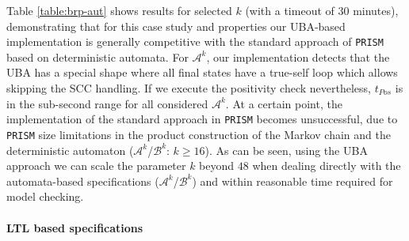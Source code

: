 \documentclass{elsarticle}
\def\cA{\mathcal{A}}
\def\cB{\mathcal{B}}
\newcommand{\prism}{\texttt{PRISM}}
\begin{document}
Table \ref{table:brp-aut} shows results for selected $k$ (with a timeout of $30$ minutes),
demonstrating that for this case study and properties
our UBA-based implementation is generally competitive with the
standard approach of \prism{} based on deterministic automata.
For $\cA^k$, our implementation detects that the UBA has a
special shape where all final states have a true-self loop which
allows skipping the SCC handling.
If we execute the positivity check nevertheless, $t_{\mathit{Pos}}$ is in the sub-second range for all considered $\cA^k$.
At a certain point, the implementation of the standard approach in
\prism{} becomes unsuccessful, due to \prism{} size
limitations in the product construction of the Markov chain and the
deterministic automaton
($\cA^k$/$\cB^k$: $k\geqslant 16$).
As can be seen, using the UBA approach
we can scale the parameter $k$ beyond $48$
when dealing directly with the automata-based specifications
($\cA^k$/$\cB^k$) and within reasonable time required for model checking.


\paragraph{LTL based specifications}
\end{document}

